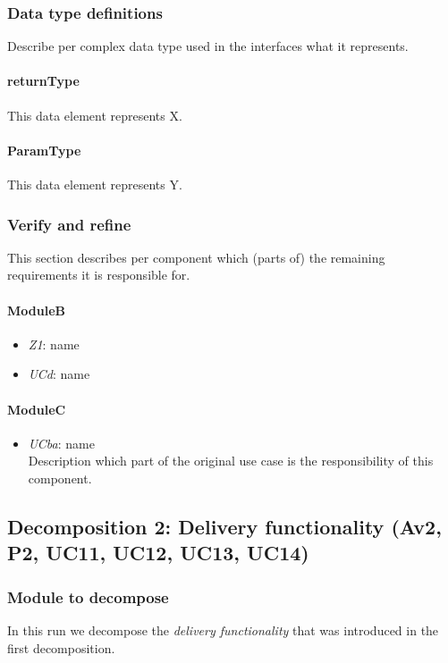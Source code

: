 \documentclass[a4paper,10pt]{article}
\begin{document}
\subsubsection{Data type definitions}
Describe per complex data type used in the interfaces what it represents.

\paragraph{returnType} This data element represents X.

\paragraph{ParamType} This data element represents Y.

\subsubsection{Verify and refine}
This section describes per component which (parts of) the remaining
requirements it is responsible for.

\paragraph{ModuleB}
\begin{itemize}
    \item \emph{Z1}: name
    \item \emph{UCd}: name
\end{itemize}

\paragraph{ModuleC}
\begin{itemize}
    \item \emph{UCba}: name\\Description which part of the original use case is
        the responsibility of this component.
\end{itemize}

\subsection{Decomposition 2: Delivery functionality (Av2, P2, UC11, UC12, UC13, UC14)}
\subsubsection{Module to decompose}
In this run we decompose the \emph{delivery functionality} that was introduced in the first decomposition.
\end{document}
